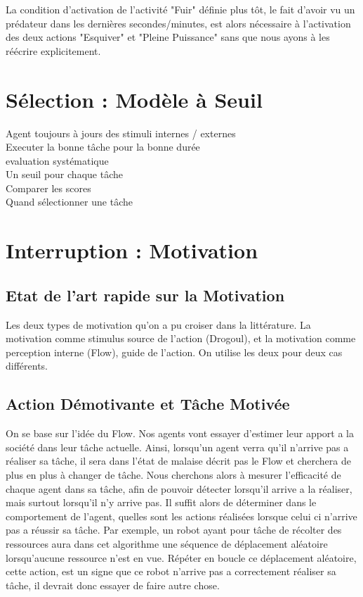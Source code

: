 \documentclass[11pt,a4paper]{report}
\begin{document}
			La condition d'activation de l'activité "Fuir" définie plus tôt, le fait d'avoir vu un prédateur dans les dernières secondes/minutes, est alors nécessaire à l'activation des deux actions "Esquiver" et "Pleine Puissance" sans que nous ayons à les réécrire explicitement.
			
	\section{Sélection : Modèle à Seuil}
		Agent toujours à jours des stimuli internes / externes\\
		Executer la bonne tâche pour la bonne durée\\
		
		evaluation systématique\\
		Un seuil pour chaque tâche\\
		Comparer les scores\\
		Quand sélectionner une tâche\\
		
	\section{Interruption : Motivation}
		\subsection{Etat de l'art rapide sur la Motivation}
			Les deux types de motivation qu'on a pu croiser dans la littérature. La motivation comme stimulus source de l'action (Drogoul), et la motivation comme perception interne (Flow), guide de l'action. On utilise les deux pour deux cas différents.
		\subsection{Action Démotivante et Tâche Motivée}
			On se base sur l'idée du Flow. Nos agents vont essayer d'estimer leur apport a la société dans leur tâche actuelle. Ainsi, lorsqu'un agent verra qu'il n'arrive pas a réaliser sa tâche, il sera dans l'état de malaise décrit pas le Flow et cherchera de plus en plus à changer de tâche. Nous cherchons alors à mesurer l'efficacité de chaque agent dans sa tâche, afin de pouvoir détecter lorsqu'il arrive a la réaliser, mais surtout lorsqu'il n'y arrive pas. Il suffit alors de déterminer dans le comportement de l'agent, quelles sont les actions réalisées lorsque celui ci n'arrive pas a réussir sa tâche. Par exemple, un robot ayant pour tâche de récolter des ressources aura dans cet algorithme une séquence de déplacement aléatoire lorsqu'aucune ressource n'est en vue. Répéter en boucle ce déplacement aléatoire, cette action, est un signe que ce robot n'arrive pas a correctement réaliser sa tâche, il devrait donc essayer de faire autre chose.
			
\end{document}
